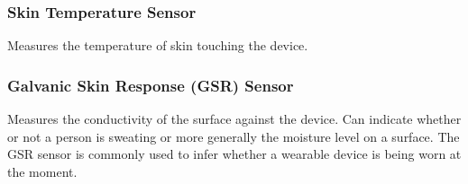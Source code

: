 \subsubsection{Skin Temperature Sensor}
Measures the temperature of skin touching the device.

\subsubsection{Galvanic Skin Response (GSR) Sensor}
Measures the conductivity of the surface against the device. Can indicate whether or not a person is sweating or more generally the moisture level on a surface. The GSR sensor is commonly used to infer whether a wearable device is being worn at the moment. 